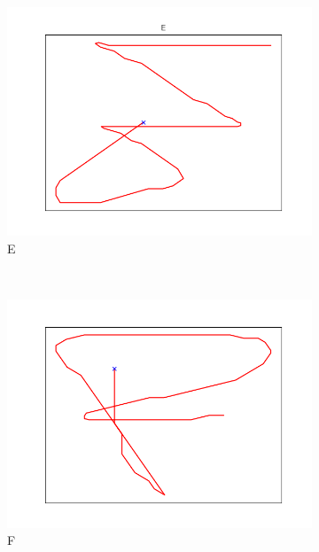 \begin{figure}
\begin{subfigure}[b]{0.14\textwidth}
        \includegraphics[width=\textwidth]{images/gbem/letters_generated/E.png}
        \caption{E}
    \end{subfigure}
    ~
    \begin{subfigure}[b]{0.14\textwidth}
        \includegraphics[width=\textwidth]{images/gbem/letters_generated/F.png}
        \caption{F}
    \end{subfigure}
    ~
    \begin{subfigure}[b]{0.14\textwidth}

\end{subfigure}
\end{figure}
